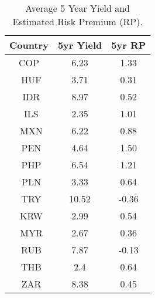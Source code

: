 \begin{table}\label{tab:5yr_rp}
\centering
\begin{tabular}{ccc}
\hline
\textbf{Country}&\textbf{5yr Yield}&\textbf{5yr RP}\\\hline
COP&6.23&1.33\\\
HUF&3.71&0.31\\\
IDR&8.97&0.52\\\
ILS&2.35&1.01\\\
MXN&6.22&0.88\\\
PEN&4.64&1.50\\\
PHP&6.54&1.21\\\
PLN&3.33&0.64\\\
TRY&10.52&-0.36\\\
KRW&2.99&0.54\\\
MYR&2.67&0.36\\\
RUB&7.87&-0.13\\\
THB&2.4&0.64\\\
ZAR&8.38&0.45\\ \hline
\end{tabular}
\\
\caption{Average 5 Year Yield and Estimated Risk Premium (RP).}
\end{table}